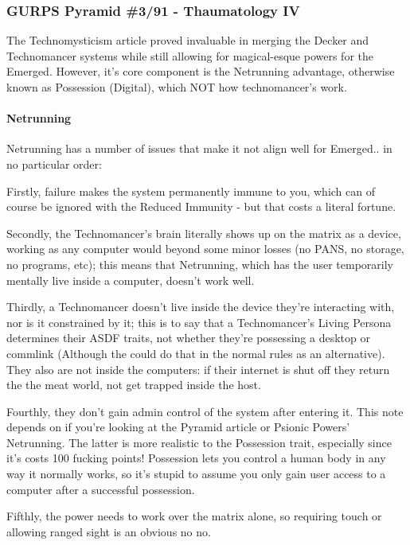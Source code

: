 \begin{multicols*}{2}
	\subsubsection{GURPS Pyramid \#3/91 - Thaumatology IV}
	
	The Technomysticism article proved invaluable in merging the Decker and Technomancer systems while still allowing for magical-esque powers for the Emerged. However, it's core component is the Netrunning advantage, otherwise known as Possession (Digital), which NOT how technomancer's work.
	
	\paragraph{Netrunning}
	
	Netrunning has a number of issues that make it not align well for Emerged.. in no particular order: 
	
	Firstly, failure makes the system permanently immune to you, which can of course be ignored with the Reduced Immunity - but that costs a literal fortune. 
	
	Secondly, the Technomancer's brain literally shows up on the matrix as a device, working as any computer would beyond some minor losses (no PANS, no storage, no programs, etc); this means that Netrunning, which has the user temporarily mentally live inside a computer, doesn't work well. 
	
	Thirdly, a Technomancer doesn't live inside the device they're interacting with, nor is it constrained by it; this is to say that a Technomancer's Living Persona determines their ASDF traits, not whether they're possessing a desktop or commlink (Although the could do that in the normal rules as an alternative). They also are not inside the computers: if their internet is shut off they return the the meat world, not get trapped inside the host.
	
	Fourthly, they don't gain admin control of the system after entering it. This note depends on if you're looking at the Pyramid article or Psionic Powers' Netrunning. The latter is more realistic to the Possession trait, especially since it's costs 100 fucking points! Possession lets you control a human body in any way it normally works, so it's stupid to assume you only gain user access to a computer after a successful possession.
	
	Fifthly, the power needs to work over the matrix alone, so requiring touch or allowing ranged sight is an obvious no no.
	

\end{multicols*}
